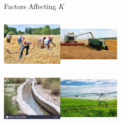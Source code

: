 \documentclass[t,9pt,aspectratio=169]{beamer}
\begin{document}
\begin{frame}{Factors Affecting $K$}

\begin{center}

 \includegraphics[width=3cm, height=2.75cm]{./figures/harvestOld}\includegraphics[width=3cm, height=2.75cm]{./figures/harvestNew}\\
 \includegraphics[width=3cm, height=2.75cm]{./figures/waterOld}\includegraphics[width=3cm, height=2.75cm]{./figures/waterNew}
 
\end{center}
 
\end{frame}
\end{document}
